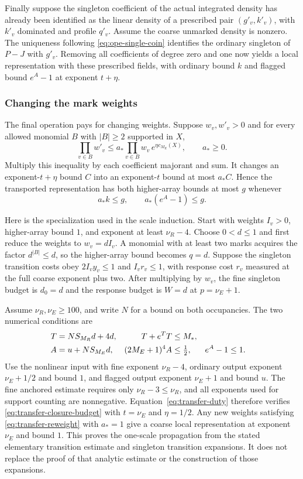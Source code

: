Finally suppose the singleton coefficient of the actual integrated
density has already been identified as the linear density of a
prescribed pair $(g'_v,k'_v)$, with $k'_v$ dominated and profile
$q'_v$. Assume the coarse unmarked density is nonzero. The
uniqueness following \eqref{eq:ope-single-coin} identifies the
ordinary singleton of $P-J$ with $g'_v$. Removing all coefficients
of degree zero and one now yields a local representation with
these prescribed fields, with ordinary bound $k$ and flagged bound
$e^A-1$ at exponent $t+\eta$.

\subsubsection{Changing the mark weights}
The final operation pays for changing weights. Suppose $w_v,w'_v>0$
and for every allowed monomial $B$ with $|B|\ge2$ supported in $X$,
\begin{equation}\label{eq:transfer-reweight}
       \prod_{v\in B}w'_v
           \le a_*\prod_{v\in B}w_v\,e^{\eta c_{M_E}(X)},
                         \qquad a_*\ge0.
\end{equation}
Multiply this inequality by each coefficient majorant and sum.
It changes an exponent-$t+\eta$ bound $C$ into an exponent-$t$
bound at most $a_*C$. Hence the transported representation has
both higher-array bounds at most $g$ whenever
\[
                       a_*k\le g,\qquad a_*(e^A-1)\le g.
\]

Here is the specialization used in the scale induction. Start
with weights $I_v>0$, higher-array bound $1$, and exponent at least
$\nu_R-4$. Choose $0<d\le1$ and first reduce the weights to
$w_v=dI_v$. A monomial with at least two marks acquires the factor
$d^{|B|}\le d$, so the higher-array bound becomes $q=d$.
Suppose the singleton transition costs obey
$2I_vy_v\le1$ and $I_vr_v\le1$, with response cost $r_v$ measured
at the full coarse exponent plus two. After multiplying by $w_v$,
the fine singleton budget is $d_0=d$ and the response budget is
$W=d$ at $p=\nu_E+1$.

Assume $\nu_R,\nu_E\ge100$, and write $N$ for a bound on both
occupancies. The two numerical conditions are
\begin{align}
 T&=NS_{M_R}d+4d,& T+e^TT&\le M_*,\label{eq:transfer-duty}\\
 A&=u+NS_{M_E}d,& (2M_E+1)^4A&\le\tfrac12,
                         &e^A-1&\le1.\notag
\end{align}
Use the nonlinear input with fine exponent $\nu_R-4$, ordinary
output exponent $\nu_E+1/2$ and bound $1$, and flagged output
exponent $\nu_E+1$ and bound $u$. The fine anchored estimate
requires only $\nu_R-3\le\nu_R$, and all exponents used for
support counting are nonnegative. Equation~\eqref{eq:transfer-duty}
therefore verifies \eqref{eq:transfer-closure-budget} with
$t=\nu_E$ and $\eta=1/2$. Any new weights satisfying
\eqref{eq:transfer-reweight} with $a_*=1$ give a coarse local
representation at exponent $\nu_E$ and bound $1$.
This proves the one-scale propagation from the stated elementary
transition estimate and singleton transition expansions. It does
not replace the proof of that analytic estimate or the construction
of those expansions.
